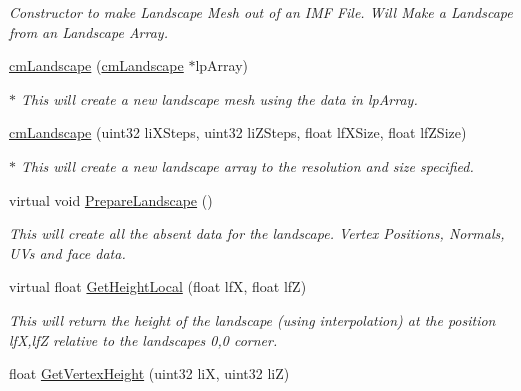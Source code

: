 \begin{DoxyCompactItemize}
\begin{DoxyCompactList}\small\item\em Constructor to make Landscape Mesh out of an IMF File. Will Make a Landscape from an Landscape Array. \end{DoxyCompactList}\item 
\hyperlink{classcm_landscape_aa1df1ae24ed2c5bb8616f21eeee3d036}{cmLandscape} (\hyperlink{classcm_landscape}{cmLandscape} $\ast$lpArray)
\begin{DoxyCompactList}\small\item\em $\ast$ This will create a new landscape mesh using the data in lpArray. \end{DoxyCompactList}\item 
\hyperlink{classcm_landscape_ae3c071c7ee84599c0fa47eba90290615}{cmLandscape} (uint32 liXSteps, uint32 liZSteps, float lfXSize, float lfZSize)
\begin{DoxyCompactList}\small\item\em $\ast$ This will create a new landscape array to the resolution and size specified. \end{DoxyCompactList}\item 
\hypertarget{classcm_landscape_aacdffaddb3fa324b0f2a88d471dea80e}{
virtual void \hyperlink{classcm_landscape_aacdffaddb3fa324b0f2a88d471dea80e}{PrepareLandscape} ()}
\label{classcm_landscape_aacdffaddb3fa324b0f2a88d471dea80e}

\begin{DoxyCompactList}\small\item\em This will create all the absent data for the landscape. Vertex Positions, Normals, UVs and face data. \end{DoxyCompactList}\item 
\hypertarget{classcm_landscape_a89d6a6a810182d712241fa3c17de5d2b}{
virtual float \hyperlink{classcm_landscape_a89d6a6a810182d712241fa3c17de5d2b}{GetHeightLocal} (float lfX, float lfZ)}
\label{classcm_landscape_a89d6a6a810182d712241fa3c17de5d2b}

\begin{DoxyCompactList}\small\item\em This will return the height of the landscape (using interpolation) at the position lfX,lfZ relative to the landscapes 0,0 corner. \end{DoxyCompactList}\item 
\hypertarget{classcm_landscape_af7ad1920fc8458d4c88c062df87325dd}{
float \hyperlink{classcm_landscape_af7ad1920fc8458d4c88c062df87325dd}{GetVertexHeight} (uint32 liX, uint32 liZ)}
\label{classcm_landscape_af7ad1920fc8458d4c88c062df87325dd}


\end{DoxyCompactItemize}
